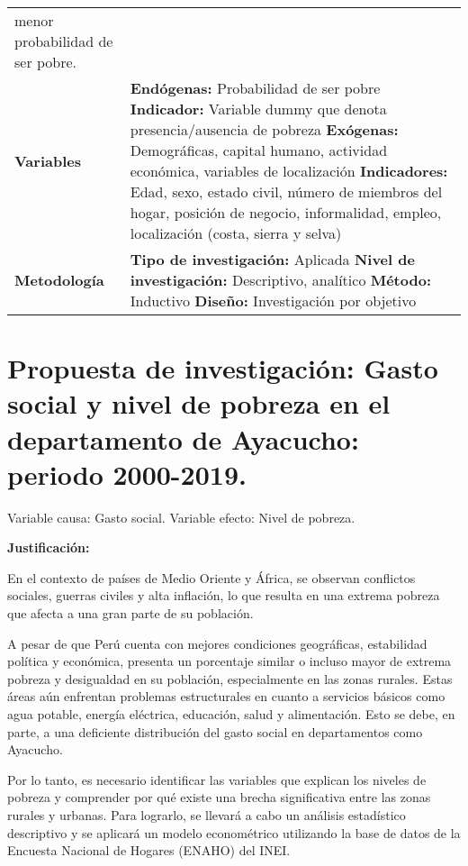 \documentclass[
  man,
  floatsintext,
  longtable,
  a4paper,
  nolmodern,
  notxfonts,
  notimes,
  colorlinks=true,linkcolor=blue,citecolor=blue,urlcolor=blue]{apa7}
\begin{document}
\begin{longtable}[]{@{}
  >{\raggedright\arraybackslash}p{}
  >{\raggedright\arraybackslash}p{}@{}}
menor probabilidad de ser pobre. \\
\textbf{Variables} & \textbf{Endógenas:} Probabilidad de ser pobre
\textbf{Indicador:} Variable dummy que denota presencia/ausencia de
pobreza \textbf{Exógenas:} Demográficas, capital humano, actividad
económica, variables de localización \textbf{Indicadores:} Edad, sexo,
estado civil, número de miembros del hogar, posición de negocio,
informalidad, empleo, localización (costa, sierra y selva) \\
\textbf{Metodología} & \textbf{Tipo de investigación:} Aplicada
\textbf{Nivel de investigación:} Descriptivo, analítico \textbf{Método:}
Inductivo \textbf{Diseño:} Investigación por objetivo \\
\end{longtable}

\section{Propuesta de investigación: Gasto social y nivel de pobreza en
el departamento de Ayacucho: periodo
2000-2019.}\label{propuesta-de-investigaciuxf3n-gasto-social-y-nivel-de-pobreza-en-el-departamento-de-ayacucho-periodo-2000-2019.}

Variable causa: Gasto social. Variable efecto: Nivel de pobreza.

\textbf{Justificación:}

En el contexto de países de Medio Oriente y África, se observan
conflictos sociales, guerras civiles y alta inflación, lo que resulta en
una extrema pobreza que afecta a una gran parte de su población.

A pesar de que Perú cuenta con mejores condiciones geográficas,
estabilidad política y económica, presenta un porcentaje similar o
incluso mayor de extrema pobreza y desigualdad en su población,
especialmente en las zonas rurales. Estas áreas aún enfrentan problemas
estructurales en cuanto a servicios básicos como agua potable, energía
eléctrica, educación, salud y alimentación. Esto se debe, en parte, a
una deficiente distribución del gasto social en departamentos como
Ayacucho.

Por lo tanto, es necesario identificar las variables que explican los
niveles de pobreza y comprender por qué existe una brecha significativa
entre las zonas rurales y urbanas. Para lograrlo, se llevará a cabo un
análisis estadístico descriptivo y se aplicará un modelo econométrico
utilizando la base de datos de la Encuesta Nacional de Hogares (ENAHO)
del INEI.
\end{document}
